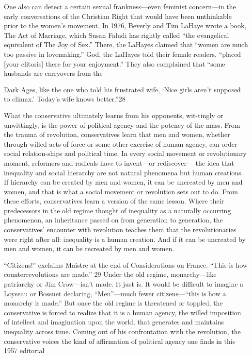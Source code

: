  \par 
One also can detect a certain sexual frankness—even feminist concern—in the early conversations of the Christian Right that would have been unthinkable prior to the women’s movement. In 1976, Beverly and Tim LaHaye wrote a book, The Act of Marriage, which Susan Faludi has rightly called “the evangelical equivalent of The Joy of Sex.” There, the LaHayes claimed that “women are much too passive in lovemaking.” God, the LaHayes told their female readers, “placed [your clitoris] there for your enjoyment.” They also complained that “some husbands are carryovers from the
 \par 
Dark Ages, like the one who told his frustrated wife, ‘Nice girls aren’t supposed to climax.’ Today’s wife knows better.”{\color{blue}28}
 \par 
What the conservative ultimately learns from his opponents, wit-tingly or unwittingly, is the power of political agency and the potency of the mass. From the trauma of revolution, conservatives learn that men and women, whether through willed acts of force or some other exercise of human agency, can order social relation-ships and political time. In every social movement or revolutionary moment, reformers and radicals have to invent—or rediscover— the idea that inequality and social hierarchy are not natural phenomena but human creations. If hierarchy can be created by men and women, it can be uncreated by men and women, and that is what a social movement or revolution sets out to do. From these efforts, conservatives learn a version of the same lesson. Where their predecessors in the old regime thought of inequality as a naturally occurring phenomenon, an inheritance passed on from generation to generation, the conservatives’ encounter with revolution teaches them that the revolutionaries were right after all: inequality is a human creation. And if it can be uncreated by men and women, it can be recreated by men and women.
 \par 
“Citizens!” exclaims Maistre at the end of Considerations on France. “This is how counterrevolutions are made.” {\color{blue}29} Under the old regime, monarchy—like patriarchy or Jim Crow—isn’t made. It just is. It would be difficult to imagine a Loyseau or Bossuet declaring, “Men”—much fewer citizens—“this is how a monarchy is made.” But once the old regime is threatened or toppled, the conservative is forced to realize that it is a human agency, the willed imposition of intellect and imagination upon the world, that generates and maintains inequality across time. Coming out of his confrontation with the revolution, the conservative voices the kind of affirmation of political agency one finds in this 1957 editorial
